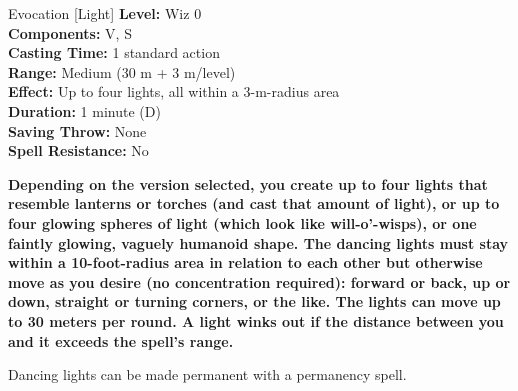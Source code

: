 {Evocation [Light]}
{
	\textbf{Level:}
	Wiz 0\\
	\textbf{Components:}
	V, S\\
	\textbf{Casting Time:}
	1 standard action\\
	\textbf{Range:}
	Medium (30 m + 3 m/level)\\
	\textbf{Effect:}
	Up to four lights, all within a 3-m-radius area\\
	\textbf{Duration:}
	1 minute (D)\\
	\textbf{Saving Throw:}
	None\\
	\textbf{Spell Resistance:}
	No\\
}
{
	\textbf{	Depending on the version selected, you create up to four lights that resemble lanterns or torches (and cast that amount of light), or up to four glowing spheres of light (which look like will-o'-wisps), or one faintly glowing, vaguely humanoid shape. The dancing lights must stay within a 10-foot-radius area in relation to each other but otherwise move as you desire (no concentration required): forward or back, up or down, straight or turning corners, or the like. The lights can move up to 30 meters per round. A light winks out if the distance between you and it exceeds the spell's range.}

	Dancing lights can be made permanent with a permanency spell.

}
